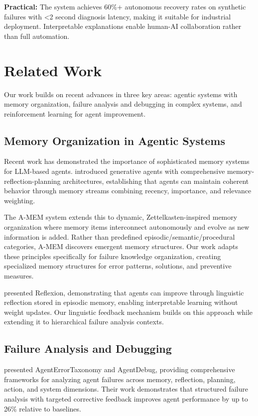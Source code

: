 \documentclass[11pt]{article}
\begin{document}
\textbf{Practical:} The system achieves 60\%+ autonomous recovery rates on synthetic failures with <2 second diagnosis latency, making it suitable for industrial deployment. Interpretable explanations enable human-AI collaboration rather than full automation.

\section{Related Work}

Our work builds on recent advances in three key areas: agentic systems with memory organization, failure analysis and debugging in complex systems, and reinforcement learning for agent improvement.

\subsection{Memory Organization in Agentic Systems}

Recent work has demonstrated the importance of sophisticated memory systems for LLM-based agents. \citet{Park2023} introduced generative agents with comprehensive memory-reflection-planning architectures, establishing that agents can maintain coherent behavior through memory streams combining recency, importance, and relevance weighting.

The A-MEM system \citep{AMEM2025} extends this to dynamic, Zettelkasten-inspired memory organization where memory items interconnect autonomously and evolve as new information is added. Rather than predefined episodic/semantic/procedural categories, A-MEM discovers emergent memory structures. Our work adapts these principles specifically for failure knowledge organization, creating specialized memory structures for error patterns, solutions, and preventive measures.

\citet{Shinn2023} presented Reflexion, demonstrating that agents can improve through linguistic reflection stored in episodic memory, enabling interpretable learning without weight updates. Our linguistic feedback mechanism builds on this approach while extending it to hierarchical failure analysis contexts.

\subsection{Failure Analysis and Debugging}

\citet{Zhu2025} presented AgentErrorTaxonomy and AgentDebug, providing comprehensive frameworks for analyzing agent failures across memory, reflection, planning, action, and system dimensions. Their work demonstrates that structured failure analysis with targeted corrective feedback improves agent performance by up to 26\% relative to baselines.
\end{document}
